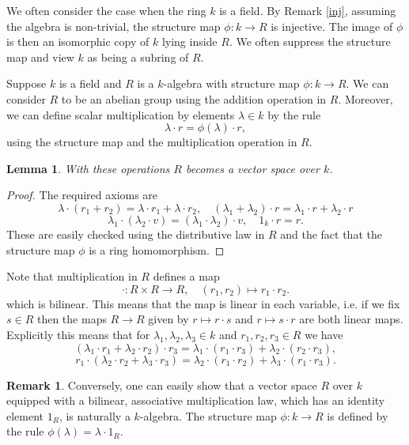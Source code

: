 \documentclass [12pt,oneside,a4paper,mathscr]{amsart}
\newtheorem{lemma}[thm]{Lemma}
\theoremstyle{definition}
\newtheorem{remark}[thm]{Remark}
\begin{document}
We often consider the case when the ring $k$ is a field. By Remark \ref{inj}, assuming the algebra is non-trivial, the structure map $\phi\colon k\to R$ is injective. The image of $\phi$ is then an isomorphic copy of $k$ lying inside $R$. We often suppress the structure map and view $k$ as being a subring of $R$. 

Suppose $k$ is a field and $R$ is a $k$-algebra with structure map $\phi\colon k\to R$.  We can consider  $R$ to be an abelian group using the addition operation in $R$. Moreover, we can define scalar multiplication by elements $\lambda\in k$ by the rule
\[\lambda\cdot r = \phi(\lambda)\cdot r,\]
using the structure map and the multiplication operation in $R$.

\begin{lemma}
With these operations $R$ becomes a vector space over $k$.
\end{lemma}

\begin{proof}
The required axioms are
\[ \lambda\cdot (r_1+r_2)=\lambda\cdot r_1 + \lambda\cdot r_2, \quad (\lambda_1+\lambda_2)\cdot r = \lambda_1\cdot r + \lambda_2\cdot r\]
\[\lambda_1\cdot (\lambda_2\cdot v)=(\lambda_1\cdot \lambda_2)\cdot v, \quad 1_k\cdot r = r.\]
These are easily checked using the distributive law in $R$ and the fact that the structure map $\phi$ is a ring homomorphism. 
\end{proof}

Note that multiplication in $R$ defines a map 
\[ \cdot \colon R \times R \to R, \quad (r_1,r_2) \mapsto r_1\cdot r_2.\]
which is bilinear. This means that the map is linear in each variable, i.e. if we fix $s\in R$ then the maps $R\to R$ given by $r\mapsto r\cdot s$ and $r\mapsto s\cdot r$ are both linear maps. Explicitly this means that  for $\lambda_1,\lambda_2,\lambda_3\in k$ and $r_1,r_2,r_3\in R$ we have
\[(\lambda_1 \cdot r_1 + \lambda_2 \cdot  r_2)\cdot r_3=\lambda_1\cdot (r_1\cdot r_3) + \lambda_2\cdot (r_2\cdot r_3),\]
\[r_1\cdot (\lambda_2 \cdot r_2 + \lambda_3 \cdot r_3)=\lambda_2 \cdot (r_1 \cdot r_2) + \lambda_3 \cdot (r_1 \cdot r_3).\]

\begin{remark}
Conversely, one can easily show that a vector space $R$ over $k$ equipped with a bilinear, associative multiplication law, which has an identity element $1_R$, is naturally a $k$-algebra. The structure map $\phi\colon k\to R$ is defined by the rule $\phi(\lambda)=\lambda\cdot 1_R$. 
\end{remark}
\end{document}
